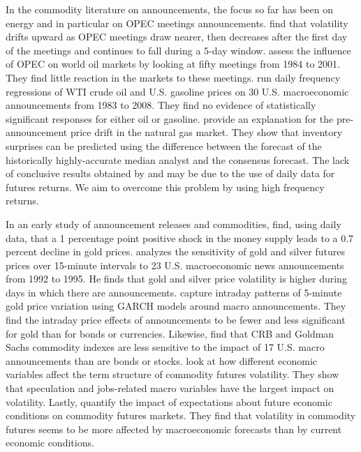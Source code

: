 \documentclass[12pt]{article}
\begin{document}
In the commodity literature on announcements, the focus so far has been on energy and in particular on OPEC meetings announcements.  \citet*{horan2004implied} find that volatility drifts upward as OPEC meetings draw nearer, then decreases after the first day of the meetings and continues to fall during a 5-day window. \citet*{wirl2004impact} assess the influence of OPEC on world oil markets by looking at fifty meetings from 1984 to 2001. They find little reaction in the markets to these meetings. \citet*{kilian2011energy} run daily frequency regressions of WTI crude oil and U.S. gasoline prices on 30 U.S. macroeconomic announcements from 1983 to 2008. They find no evidence of statistically significant responses for either oil or gasoline.  \citet*{gu2018drives} provide an explanation for the pre-announcement price drift in the natural gas market. They show that inventory surprises can be predicted using the difference between the forecast of the historically highly-accurate median analyst and the consensus forecast. The lack of conclusive results obtained by \citet*{wirl2004impact} and \citet*{kilian2011energy} may be due to the use of daily data for futures returns. We aim to overcome this problem by using high frequency returns. 




In an early study of announcement releases and commodities, \citet*{frankel1985commodity} find, using daily data, that a 1 percentage point positive shock in the money supply leads to a 0.7 percent decline in gold prices. \citet*{christie2000macroeconomics} analyzes the sensitivity of gold and silver futures prices over 15-minute intervals to 23 U.S. macroeconomic news announcements from 1992 to 1995. He finds that gold and silver price volatility is higher during days in which there are announcements. \citet*{cai2001moves} capture intraday patterns of 5-minute gold price variation using GARCH models around macro announcements. They find the intraday price effects of announcements to be fewer and less significant for gold than for bonds or currencies.  Likewise, \citet*{hess2008commodity} find that CRB and Goldman Sachs commodity indexes are less sensitive to the impact of 17 U.S. macro announcements than are bonds or stocks.  \citet*{hollstein2020volatility} look at how different economic variables affect the term structure of commodity futures volatility. They show that speculation and jobs-related macro variables have the largest impact on volatility. Lastly, \citet*{ye2021macroeconomic} quantify the impact of expectations about future economic conditions on commodity futures markets. They find that volatility in commodity futures seems to be more affected by macroeconomic forecasts than by current economic conditions. 
\end{document}
